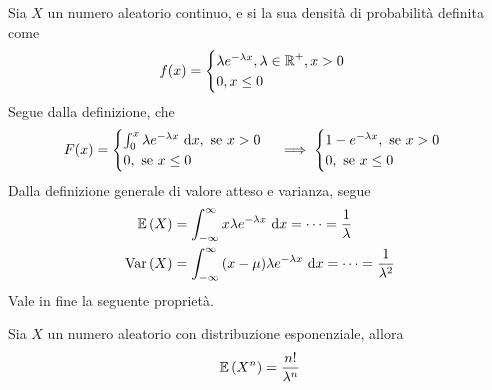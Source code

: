 \documentclass{subfiles}
\begin{document}
Sia \(X\) un numero aleatorio continuo, e si la sua densità di probabilità definita come
\[
    f(x) = \begin{cases}
        \lambda e^{-\lambda x}, \lambda \in \operatorname{\mathbb{R}}^{+}, x > 0 \\
        0, x \le 0
    \end{cases}\]
Segue dalla definizione, che
\[
    F(x) = \begin{cases}
        \Int{\lambda e^{-\lambda x}}{x}[0][x], \text{se} x > 0 \\
        0, \text{se} x \le 0
    \end{cases}   \implies \begin{cases}
        1 - e^{-\lambda x}, \text{se} x > 0 \\
        0, \text{se} x \le 0
    \end{cases}\]
Dalla definizione generale di valore atteso e varianza, segue
\[\begin{aligned}
        \Expected{X} & = \Int{x \lambda e^{-\lambda x}}{x}[-\infty][\infty] = \cdots = \Frac{1}{\lambda}             \\
        \Var{X}      & = \Int{(x - \mu) \lambda e^{-\lambda x}}{x}[-\infty][\infty] = \cdots = \Frac{1}{\lambda^{2}}
    \end{aligned}\]
Vale in fine la seguente proprietà.
\begin{Property*}
    Sia \(X\) un numero aleatorio con distribuzione esponenziale, allora
    \[
        \Expected{X^{n}} = \Frac{n!}{\lambda^{n}}
    \]
\end{Property*}
\end{document}
